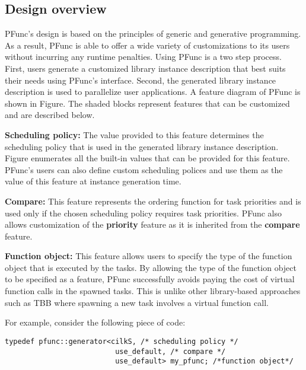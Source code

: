 \documentclass{sig-alternate}
\begin{document}
\subsection{Design overview}
\label{sec:design}
PFunc's design is based on the principles of generic and generative
programming. As a result, PFunc is able to offer a wide variety of
customizations to its users without incurring any runtime penalties.  Using
PFunc is a two step process. First, users generate a customized library
instance description that best suits their needs using PFunc's 
interface. Second, the generated library instance description is used to
parallelize user applications. A feature diagram of PFunc is shown in
Figure. The shaded blocks represent features that
can be customized and are described below.
\begin{list}{}{\leftmargin=1em}
\item \textbf{Scheduling policy:}
The value provided to this feature determines the scheduling policy that is
used in the generated library instance description.  Figure
enumerates all the built-in values that can be provided for this feature.
PFunc's users can also define custom scheduling polices and use them as the
value of this feature at instance generation time.
\item \textbf{Compare:}
This feature represents the ordering function for task priorities and is used
only if the chosen scheduling policy requires task priorities. PFunc also
allows customization of the \textbf{priority} feature as it is inherited from
the \textbf{compare} feature.
\item \textbf{Function object:}
This feature allows users to specify the type of the function object that is
executed by the tasks.  By allowing the type of the function object to be
specified as a feature, PFunc successfully avoids paying the cost of virtual
function calls in the spawned tasks. This is unlike other library-based
approaches such as TBB where spawning a new task involves a virtual function
call.  
\end{list}

For example, consider the following piece of code:

\begin{lstlisting}
typedef pfunc::generator<cilkS, /* scheduling policy */
                          use_default, /* compare */
                          use_default> my_pfunc; /*function object*/
\end{lstlisting}
\end{document}
